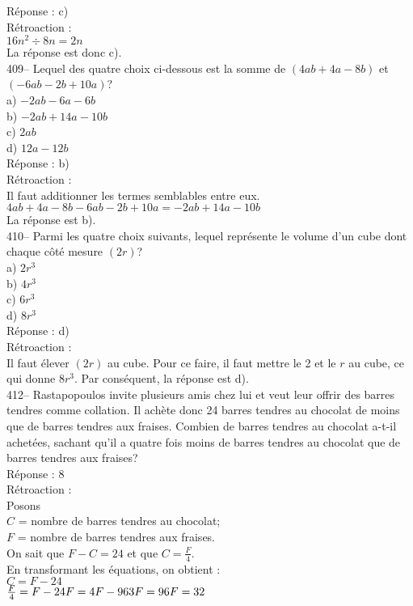 ﻿\documentclass[letterpaper, 12pt]{article}
\begin{document}
R\'eponse : c)\\

R\'etroaction : \\
$16n^{2}\div8n=2n$\\
La r\'eponse est donc c).\\

409-- Lequel des quatre choix ci-dessous est la somme de
$\left(4ab+4a-8b\right) $ et $\left(-6ab-2b+10a\right)$?\\
a) $-2ab-6a-6b$\\
b) $-2ab+14a-10b$\\
c) $2ab$\\
d) $12a-12b$\\

R\'eponse : b)\\

R\'etroaction : \\
Il faut additionner les termes semblables entre eux.\\
$4ab+4a-8b-6ab-2b+10a=-2ab+14a-10b$\\
La r\'eponse est b).\\

410-- Parmi les quatre choix suivants, lequel repr\'esente le volume d'un
cube dont chaque c\^ot\'e mesure $\left( 2r\right)$?\\
a) $2r^{3}$\\
b) $4r^{3}$ \\
c) $6r^{3}$\\
d) $8r^{3}$\\

R\'eponse : d)\\

R\'etroaction : \\
Il faut \'elever $\left( 2r\right)$ au cube.  Pour ce faire, il faut mettre
le 2 et le $r$ au cube, ce qui donne $8r^{3}$.  Par cons\'equent, la
r\'eponse est d).\\


412-- Rastapopoulos invite plusieurs amis chez lui et veut leur offrir des
barres tendres comme collation.  Il ach\`ete donc 24 barres tendres au
chocolat de moins que de barres tendres aux fraises.  Combien de barres
tendres au chocolat a-t-il achet\'ees, sachant qu'il a quatre fois moins de
barres tendres au chocolat que de barres tendres aux fraises?\\

R\'eponse : 8\\

R\'etroaction : \\
Posons\\
$C$ = nombre de barres tendres au chocolat;\\
$F$ = nombre de barres tendres aux fraises.\\
On sait que $F-C=24$ et que $C=\frac{F}{4}$.\\
En transformant les \'equations, on obtient :\\
$C=F-24$\\
$\frac{F}{4}=F-24\\
F=4F-96\\
3F=96\\
F=32$\\
\end{document}
